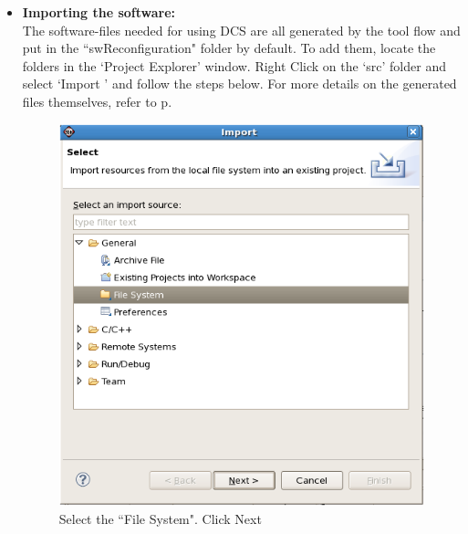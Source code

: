 \documentclass[a4paper,oneside]{memoir}
\begin{document}
\begin{itemize}
\item \textbf{Importing the software:}\label{sec:import_software_blaze}\\
The software-files needed for using DCS are all generated by the tool flow and put in the ``swReconfiguration" folder by default. To add them, locate the folders in the `Project Explorer' window. Right Click on the `src' folder and select `Import ' and follow the steps below. For more details on the generated files themselves, refer to p. \pageref{sec:writing_software}
\begin{figure}[H]
\centering
\includegraphics[scale=0.5]{softwarestep6}
\caption{Select the ``File System". Click Next \label{fig:softwarestep6}}
\end{figure}
\begin{figure}[H]
\centering

\end{figure}
\end{itemize}
\end{document}
